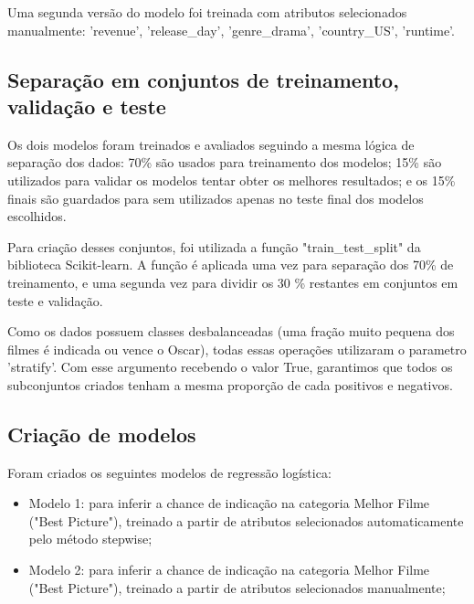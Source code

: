        Uma segunda versão do modelo foi treinada com atributos selecionados manualmente: 'revenue', 'release\_day', 'genre\_drama', 'country\_US', 'runtime'.

        \subsection{Separação em conjuntos de treinamento, validação e teste}\par
        
        Os dois modelos foram treinados e avaliados seguindo a mesma lógica de separação dos dados: 70\% são usados para treinamento dos modelos; 15\% são utilizados para validar os modelos tentar obter os melhores resultados; e os 15\% finais são guardados para sem utilizados apenas no teste final dos modelos escolhidos.
        
        Para criação desses conjuntos, foi utilizada a função "train\_test\_split" da biblioteca Scikit-learn. A função é aplicada uma vez para separação dos 70\% de treinamento, e uma segunda vez para dividir os 30 \% restantes em conjuntos em teste e validação.\newline
        
        Como os dados possuem classes desbalanceadas (uma fração muito pequena dos filmes é indicada ou vence o Oscar), todas essas operações utilizaram o parametro 'stratify'. Com esse argumento recebendo o valor True, garantimos que todos os subconjuntos criados tenham a mesma proporção de cada positivos e negativos.

        \subsection{Criação de modelos}\par
        Foram criados os seguintes modelos de regressão logística:
        
        \begin{itemize}
            \item Modelo 1: para inferir a chance de indicação na categoria Melhor Filme ("Best Picture"), treinado a partir de atributos selecionados automaticamente pelo método stepwise;
            
            \item Modelo 2: para inferir a chance de indicação na categoria Melhor Filme ("Best Picture"), treinado a partir de atributos selecionados manualmente;

        \end{itemize}
        
